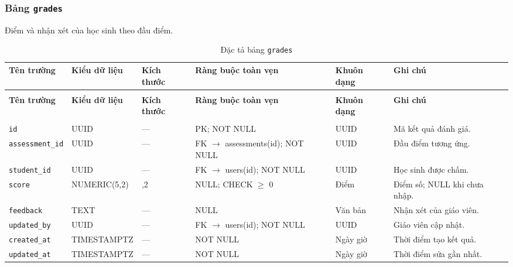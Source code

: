 \subsubsection{Bảng \texttt{grades}}
Điểm và nhận xét của học sinh theo đầu điểm.

\begingroup
\fontsize{9.2}{11.2}\selectfont
\setlength{\tabcolsep}{2.4pt}
\renewcommand{\arraystretch}{1.22}
\begin{longtable}{|>{\raggedright\arraybackslash}p{2.25cm}|>{\raggedright\arraybackslash}p{2.48cm}|>{\raggedright\arraybackslash}p{0.95cm}|>{\raggedright\arraybackslash}p{3.0cm}|>{\raggedright\arraybackslash}p{1.25cm}|>{\raggedright\arraybackslash}p{4.27cm}|}
\caption{Đặc tả bảng \texttt{grades}}\label{tab:csdl:grades}\\
\hline\rowcolor{blue!11}\textbf{Tên trường}&\textbf{Kiểu dữ liệu}&\textbf{Kích thước}&\textbf{Ràng buộc toàn vẹn}&\textbf{Khuôn dạng}&\textbf{Ghi chú}\\\hline
\endfirsthead
\multicolumn{6}{r}{\textit{Tiếp bảng \texttt{grades}}}\\
\hline\rowcolor{blue!11}\textbf{Tên trường}&\textbf{Kiểu dữ liệu}&\textbf{Kích thước}&\textbf{Ràng buộc toàn vẹn}&\textbf{Khuôn dạng}&\textbf{Ghi chú}\\\hline
\endhead
\hline\multicolumn{6}{r}{\footnotesize\textit{Còn tiếp trang sau}}\\
\endfoot
\hline
\endlastfoot
\texttt{id} & UUID & — & PK; NOT NULL & UUID & Mã kết quả đánh giá.\\\hline
\rowcolor{gray!5}
\texttt{assessment\_\allowbreak{}id} & UUID & — & FK $\rightarrow$ assessments(id); NOT NULL & UUID & Đầu điểm tương ứng.\\\hline
\texttt{student\_\allowbreak{}id} & UUID & — & FK $\rightarrow$ users(id); NOT NULL & UUID & Học sinh được chấm.\\\hline
\rowcolor{gray!5}
\texttt{score} & NUMERIC(5,2) & 5,2 & NULL; CHECK $\geq$ 0 & Điểm & Điểm số; NULL khi chưa nhập.\\\hline
\texttt{feedback} & TEXT & — & NULL & Văn bản & Nhận xét của giáo viên.\\\hline
\rowcolor{gray!5}
\texttt{updated\_\allowbreak{}by} & UUID & — & FK $\rightarrow$ users(id); NOT NULL & UUID & Giáo viên cập nhật.\\\hline
\texttt{created\_\allowbreak{}at} & TIMESTAMPTZ & — & NOT NULL & Ngày giờ & Thời điểm tạo kết quả.\\\hline
\rowcolor{gray!5}
\texttt{updated\_\allowbreak{}at} & TIMESTAMPTZ & — & NOT NULL & Ngày giờ & Thời điểm sửa gần nhất.\\\hline
\end{longtable}
\endgroup

